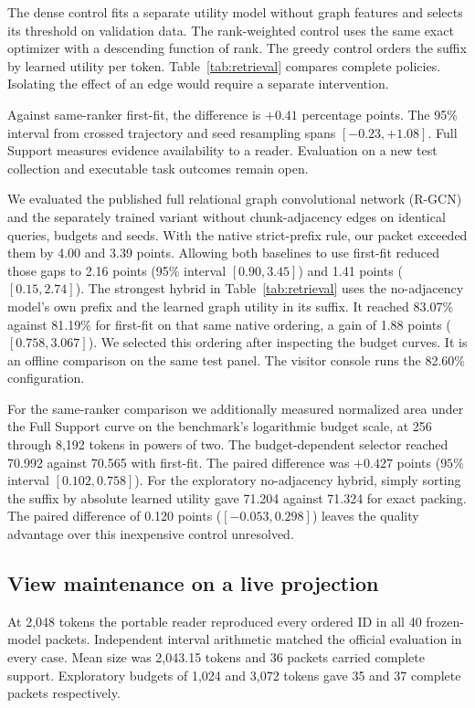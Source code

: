 \documentclass[conference]{IEEEtran}
\begin{document}
The dense control fits a separate utility model without graph features and selects its threshold on validation data. The rank-weighted control uses the same exact optimizer with a descending function of rank. The greedy control orders the suffix by learned utility per token. Table~\ref{tab:retrieval} compares complete policies. Isolating the effect of an edge would require a separate intervention.

Against same-ranker first-fit, the difference is $+0.41$ percentage points. The 95\% interval from crossed trajectory and seed resampling spans $[-0.23,+1.08]$. Full Support measures evidence availability to a reader. Evaluation on a new test collection and executable task outcomes remain open.

We evaluated the published full relational graph convolutional network (R-GCN) and the separately trained variant without chunk-adjacency edges on identical queries, budgets and seeds. With the native strict-prefix rule, our packet exceeded them by 4.00 and 3.39 points. Allowing both baselines to use first-fit reduced those gaps to 2.16 points (95\% interval $[0.90,3.45]$) and 1.41 points ($[0.15,2.74]$). The strongest hybrid in Table~\ref{tab:retrieval} uses the no-adjacency model's own prefix and the learned graph utility in its suffix. It reached 83.07\% against 81.19\% for first-fit on that same native ordering, a gain of 1.88 points ($[0.758,3.067]$). We selected this ordering after inspecting the budget curves. It is an offline comparison on the same test panel. The visitor console runs the 82.60\% configuration.

For the same-ranker comparison we additionally measured normalized area under the Full Support curve on the benchmark's logarithmic budget scale, at 256 through 8,192 tokens in powers of two. The budget-dependent selector reached 70.992 against 70.565 with first-fit. The paired difference was $+0.427$ points ($95\%$ interval $[0.102,0.758]$). For the exploratory no-adjacency hybrid, simply sorting the suffix by absolute learned utility gave 71.204 against 71.324 for exact packing. The paired difference of 0.120 points ($[-0.053,0.298]$) leaves the quality advantage over this inexpensive control unresolved.

\subsection{View maintenance on a live projection}
At 2,048 tokens the portable reader reproduced every ordered ID in all 40 frozen-model packets. Independent interval arithmetic matched the official evaluation in every case. Mean size was 2,043.15 tokens and 36 packets carried complete support. Exploratory budgets of 1,024 and 3,072 tokens gave 35 and 37 complete packets respectively.
\end{document}
